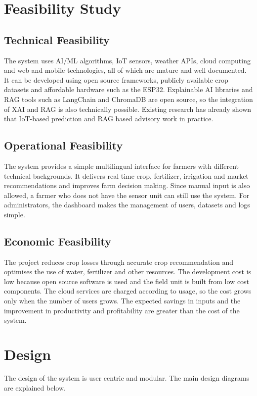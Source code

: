 \section{Feasibility Study}
\subsection{Technical Feasibility}
The system uses AI/ML algorithms, IoT sensors, weather APIs, cloud computing and web and mobile technologies, all of which are mature and well documented. It can be developed using open source frameworks, publicly available crop datasets and affordable hardware such as the ESP32. Explainable AI libraries and RAG tools such as LangChain and ChromaDB are open source, so the integration of XAI and RAG is also technically possible. Existing research \cite{sharafat2025,sawant2026} has already shown that IoT-based prediction and RAG based advisory work in practice.

\subsection{Operational Feasibility}
The system provides a simple multilingual interface for farmers with different technical backgrounds. It delivers real time crop, fertilizer, irrigation and market recommendations and improves farm decision making. Since manual input is also allowed, a farmer who does not have the sensor unit can still use the system. For administrators, the dashboard makes the management of users, datasets and logs simple.

\subsection{Economic Feasibility}
The project reduces crop losses through accurate crop recommendation and optimises the use of water, fertilizer and other resources. The development cost is low because open source software is used and the field unit is built from low cost components. The cloud services are charged according to usage, so the cost grows only when the number of users grows. The expected savings in inputs and the improvement in productivity and profitability are greater than the cost of the system.

\section{Design}
The design of the system is user centric and modular. The main design diagrams are explained below.

